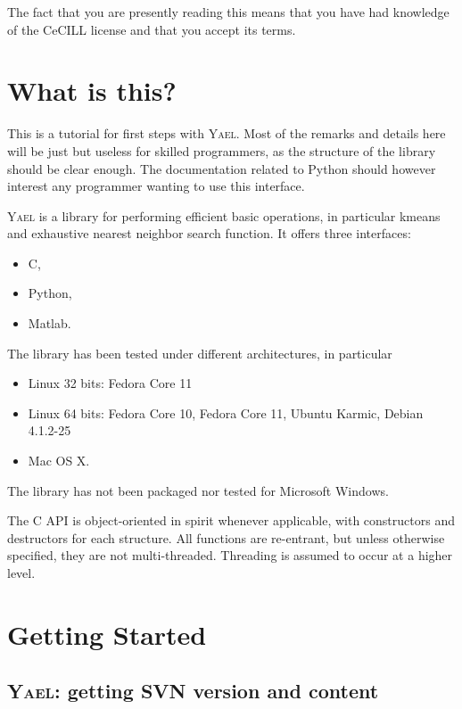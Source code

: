 \documentclass[a4paper,11pt,notitlepage,final,twoside]{report}
\newcommand{\yael}{\textsc{Yael}\xspace}
\begin{document}
The fact that you are presently reading this means that you have had
knowledge of the CeCILL license and that you accept its terms.


\tableofcontents            %


\chapter{What is this?}

This is a tutorial for first steps with \yael. Most of the remarks and details here will be just but useless for skilled programmers, as the structure of the library should be clear enough. The documentation related to Python should however interest any programmer wanting to use this interface. 
\medskip

\yael is a library for performing efficient basic operations, 
in particular kmeans and exhaustive nearest neighbor search function.
It offers three interfaces: 
\begin{itemize}
\item C, 
\item Python, 
\item Matlab.
\end{itemize}

The library has been tested under different architectures, in particular
\begin{itemize}
\item Linux 32 bits: Fedora Core 11
\item Linux 64 bits: Fedora Core 10, Fedora Core 11, Ubuntu Karmic, Debian 4.1.2-25
\item Mac OS X. 
\end{itemize}
The library has not been packaged nor tested for Microsoft Windows. 

The C API is object-oriented in spirit whenever applicable, with constructors and destructors for each structure. All functions are re-entrant, but unless otherwise specified, they are not multi-threaded. Threading is assumed to occur at a higher level. 

\chapter{Getting Started}
\label{cha:gettingstarted}

\section{\yael: getting SVN version and content}
\end{document}
